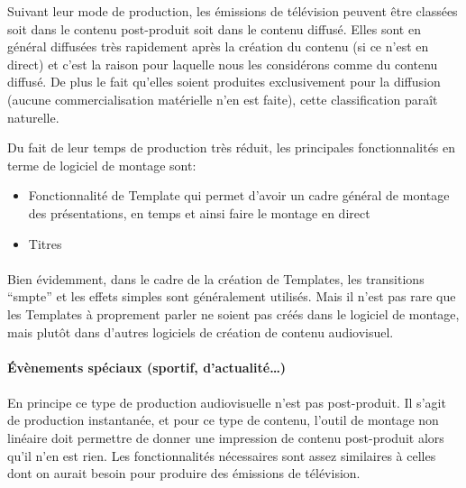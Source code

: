 Suivant leur mode de production, les émissions de télévision peuvent
être classées soit dans le contenu post-produit soit dans le contenu
diffusé. Elles sont en général diffusées très rapidement après la
création du contenu (si ce n'est en direct) et c'est la raison pour
laquelle nous les considérons comme du contenu diffusé. De plus le
fait qu'elles soient produites exclusivement pour la diffusion (aucune
commercialisation matérielle n'en est faite), cette classification
paraît naturelle.

Du fait de leur temps de production très réduit, les principales
fonctionnalités en terme de logiciel de montage sont:

\begin{itemize} \setlength{\itemsep}{2mm}

  \item{Fonctionnalité de Template qui permet d'avoir un cadre général
    de montage des présentations, en temps et ainsi faire le montage
    en direct}

  \item{Titres}

\end{itemize}

\paragraph{}

Bien évidemment, dans le cadre de la création de Templates,
les transitions ``smpte'' et les effets simples sont
généralement utilisés. Mais il n'est pas rare que les Templates à
proprement parler ne soient pas créés dans le logiciel de montage,
mais plutôt dans d'autres logiciels de création de contenu audiovisuel.

\paragraph {Évènements spéciaux (sportif, d'actualité\ldots)}

\paragraph{}

En principe ce type de production audiovisuelle n'est pas post-produit. Il
s'agit de production instantanée, et pour ce type de contenu, l'outil
de montage non linéaire doit permettre de donner une impression de
contenu post-produit alors qu'il n'en est rien. Les fonctionnalités
nécessaires sont assez similaires à celles dont on aurait besoin pour
produire des émissions de télévision.

